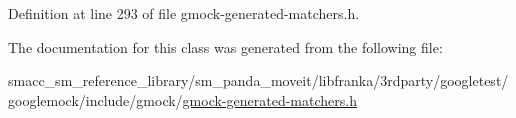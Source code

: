 Definition at line 293 of file gmock-\/generated-\/matchers.\+h.



The documentation for this class was generated from the following file\+:\begin{DoxyCompactItemize}
\item 
smacc\+\_\+sm\+\_\+reference\+\_\+library/sm\+\_\+panda\+\_\+moveit/libfranka/3rdparty/googletest/googlemock/include/gmock/\hyperlink{gmock-generated-matchers_8h}{gmock-\/generated-\/matchers.\+h}\end{DoxyCompactItemize}
